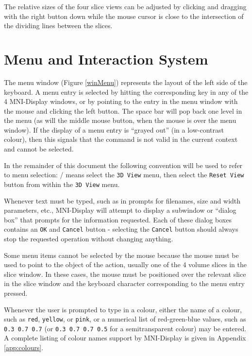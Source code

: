 \documentclass[11pt,letterpaper]{article}
\newcommand{\ident}[1]{{\tt #1}}
\newcommand{\display}{\mbox{MNI-Display}}
\newcommand{\menutwo}[2]{{\scriptsize \fbox{\bf #1}/\fbox{\bf #2}}}
\begin{document}
The relative sizes of the four slice views can be adjusted by clicking
and dragging with the right button down while the mouse cursor is
close to the intersection of the dividing lines between the slices.

\section{Menu and Interaction System}

The menu window (Figure \ref{winMenu}) represents the
layout of the left side of the keyboard.  A menu entry is selected by
hitting the corresponding key in any of the 4 \display{} windows, or
by pointing to the entry in the menu window with the mouse and
clicking the left button. The space bar will pop back one level in the
menu (as will the middle mouse button, when the mouse is over the menu
window). If the display of a menu entry is ``grayed out'' (in a
low-contrast colour), then this signals that the command is not valid
in the current context and cannot be selected.

In the remainder of this document the following convention will be
used to refer to menu selection: \menutwo{3D View}{Reset View} means
select the \ident{3D View} menu, then select the \ident{Reset View}
button from within the \ident{3D View} menu.

Whenever text must be typed, such as in prompts for filenames, size
and width parameters, etc., \display{} will attempt to display a
subwindow or ``dialog box'' that prompts for the information
requested. Each of these dialog boxes contains an \ident{OK} and
\ident{Cancel} button - selecting the \ident{Cancel} button should
always stop the requested operation without changing anything.

Some menu items cannot be selected by the mouse because the mouse must
be used to point to the object of the action, usually one of the 4
volume slices in the slice window.  In these cases, the mouse must be
positioned over the relevant slice in the slice window and the
keyboard character corresponding to the menu entry pressed.

Whenever the user is prompted to type in a colour, either the name of
a colour, such as \ident{red}, \ident{yellow}, or \ident{pink}, or a
numerical list of red-green-blue values, such as \mbox{\ident{0.3 0.7 0.7}}
(or \mbox{\ident{0.3 0.7 0.7 0.5}} for a semitransparent colour) may
be entered. A complete listing of colour names support by \display{} is
given in Appendix \ref{app:colours}.
\end{document}
